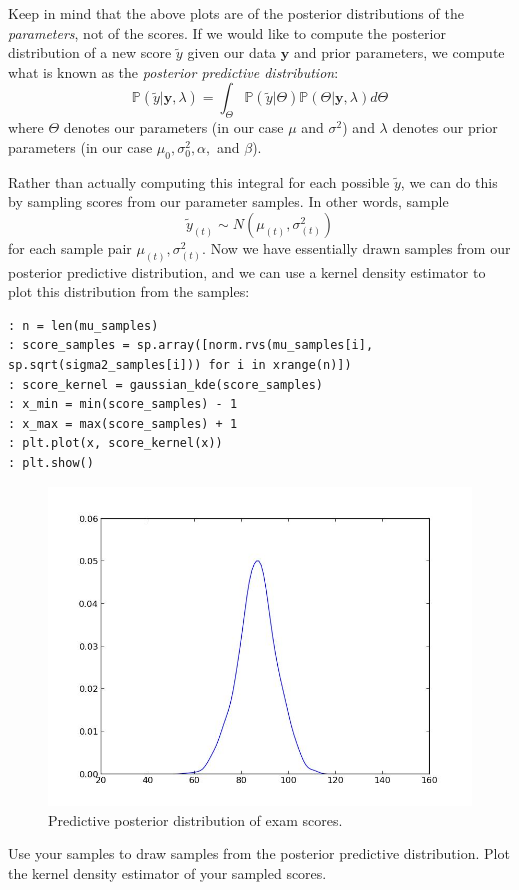 Keep in mind that the above plots are of the posterior distributions of the \emph{parameters}, not of the scores. If we would like to compute the posterior distribution of a new score $\tilde{y}$ given our data $\mathbf{y}$ and prior parameters, we compute what is known as the \emph{posterior predictive distribution}: 
\begin{equation*}
\mathbb{P}(\tilde{y} | \mathbf{y}, \lambda) = \int_{\Theta} \mathbb{P}(\tilde{y} | \Theta)\mathbb{P}(\Theta | \mathbf{y}, \lambda) d\Theta
\end{equation*}
where $\Theta$ denotes our parameters (in our case $\mu$ and $\sigma^{2}$) and $\lambda$ denotes our prior parameters (in our case $\mu_{0}, \sigma_{0}^{2}, \alpha,$ and $\beta$).

Rather than actually computing this integral for each possible $\tilde{y}$, we can do this by sampling scores from our parameter samples. In other words, sample 
\begin{equation*}
\tilde{y}_{(t)} \sim N(\mu_{(t)}, \sigma_{(t)}^{2})
\end{equation*}
for each sample pair $\mu_{(t)}, \sigma_{(t)}^{2}$. Now we have essentially drawn samples from our posterior predictive distribution, and we can use a kernel density estimator to plot this distribution from the samples:
\begin{lstlisting}
: n = len(mu_samples)
: score_samples = sp.array([norm.rvs(mu_samples[i], sp.sqrt(sigma2_samples[i])) for i in xrange(n)])
: score_kernel = gaussian_kde(score_samples)
: x_min = min(score_samples) - 1
: x_max = max(score_samples) + 1
: plt.plot(x, score_kernel(x))
: plt.show()
\end{lstlisting}

\begin{figure}
\centering
\includegraphics[width=\textwidth]{predictiveposterior.jpeg}
\caption{Predictive posterior distribution of exam scores.}
\end{figure}

\begin{problem}
Use your samples to draw samples from the posterior predictive distribution. Plot the kernel density estimator of your sampled scores.
\end{problem}